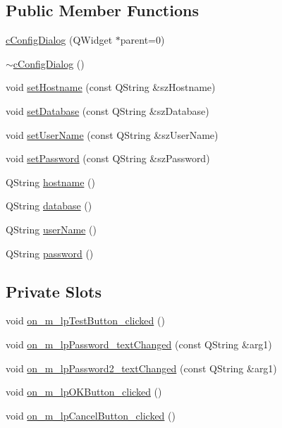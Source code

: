 \subsection*{Public Member Functions}
\begin{DoxyCompactItemize}
\item 
\hyperlink{classc_config_dialog_aa89869d702a4d9a2dd94086bc8d700ee}{c\+Config\+Dialog} (Q\+Widget $\ast$parent=0)
\item 
\hyperlink{classc_config_dialog_ae88187dcf8dfc433b53b26bd5e54f871}{$\sim$c\+Config\+Dialog} ()
\item 
void \hyperlink{classc_config_dialog_acb0a82e1653578edc43855af17154f24}{set\+Hostname} (const Q\+String \&sz\+Hostname)
\item 
void \hyperlink{classc_config_dialog_abcb15989a34c945128e8624b93b5c272}{set\+Database} (const Q\+String \&sz\+Database)
\item 
void \hyperlink{classc_config_dialog_ae3238bbd8055b58066046840fef448b4}{set\+User\+Name} (const Q\+String \&sz\+User\+Name)
\item 
void \hyperlink{classc_config_dialog_a1eecd4be7061043a3ae60473013edfb1}{set\+Password} (const Q\+String \&sz\+Password)
\item 
Q\+String \hyperlink{classc_config_dialog_a77e56b372e8914cf531d64054cbaea2c}{hostname} ()
\item 
Q\+String \hyperlink{classc_config_dialog_a1ab3c4cf07b4bb84624ddfe4395a1935}{database} ()
\item 
Q\+String \hyperlink{classc_config_dialog_ad1f4eda37fec241ffbcc158c039accea}{user\+Name} ()
\item 
Q\+String \hyperlink{classc_config_dialog_aea1dfbe7eae14e7949a15631ed2df8a5}{password} ()
\end{DoxyCompactItemize}
\subsection*{Private Slots}
\begin{DoxyCompactItemize}
\item 
void \hyperlink{classc_config_dialog_a7fb2127745f898b2c7fd8306ea7df149}{on\+\_\+m\+\_\+lp\+Test\+Button\+\_\+clicked} ()
\item 
void \hyperlink{classc_config_dialog_a06a5e35e33fe97b46813ecb70fddb1ef}{on\+\_\+m\+\_\+lp\+Password\+\_\+text\+Changed} (const Q\+String \&arg1)
\item 
void \hyperlink{classc_config_dialog_aaf2c308f17983e14ac6ea8824ffa99c4}{on\+\_\+m\+\_\+lp\+Password2\+\_\+text\+Changed} (const Q\+String \&arg1)
\item 
void \hyperlink{classc_config_dialog_ab1dd081ac31a02ff0d53d2f271fdeed5}{on\+\_\+m\+\_\+lp\+O\+K\+Button\+\_\+clicked} ()
\item 
void \hyperlink{classc_config_dialog_ac70b6c699e0eb5af4397a5a2ff29789a}{on\+\_\+m\+\_\+lp\+Cancel\+Button\+\_\+clicked} ()
\end{DoxyCompactItemize}
